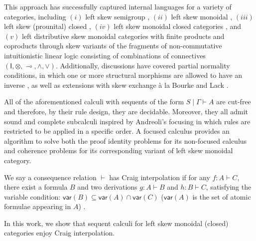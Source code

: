 \documentclass[submission,copyright,creativecommons]{eptcs}
\theoremstyle{definition}
\newcommand{\GG}{\Gamma}
\newcommand{\GT}{\Theta}
\newcommand{\vd}{\vdash}
\newcommand{\ot}{\otimes}
\newcommand{\lolli}{\multimap}
\newcommand{\I}{\mathsf{I}}
\newcommand{\vars}[1]{\mathsf{var}(#1)}
\begin{document}
This approach has successfully captured internal languages for a variety of categories, including  $(i)$ left skew semigroup \cite{zeilberger:semiassociative:19}, $(ii)$ left skew monoidal \cite{uustalu:sequent:2021}, $(iii)$ left skew (prounital) closed \cite{uustalu:deductive:nodate}, $(iv)$ left skew monoidal closed categories \cite{UVW:protsn,veltri:multifocus:23}, and $(v)$ left distributive skew monoidal categories with finite products and coproducts \cite{VW:2023} through skew variants of the fragments of non-commutative intuitionistic linear logic consisting of combinations of connectives $(\I,\ot,\lolli,\land,\lor)$.
Additionally, discussions have covered partial normality conditions, in which one or more structural morphisms are allowed to have an inverse \cite{uustalu:proof:nodate}, as well as extensions with skew exchange à la Bourke and Lack \cite{veltri:coherence:2021,VW:2023}.

All of the aforementioned calculi with sequents of the form $S \mid \GG \vd A$ are cut-free and therefore, by their rule design, they are decidable.
Moreover, they all admit sound and complete subcalculi inspired by Andreoli's focusing \cite{andreoli:logic:1992} in which
rules are restricted to be applied in a specific order.
A focused calculus provides an algorithm to solve both the proof identity problems for its non-focused calculus and coherence problems for its corresponding variant of left skew monoidal category.

We say a consequence relation $\vdash$ has Craig interpolation if for any $f: A \vdash C$, there exist a formula $B$ and two derivations $g: A \vdash B$ and $h: B \vdash C$, satisfying the variable condition: $\vars{B} \subseteq \vars{A} \cap \vars{C}$ ($\vars{A}$ is the set of atomic formulae appearing in $A$) \cite{craig:interpolation:1957}.

In this work, we show that sequent calculi for left skew monoidal (closed) categories enjoy Craig interpolation.

\end{document}
